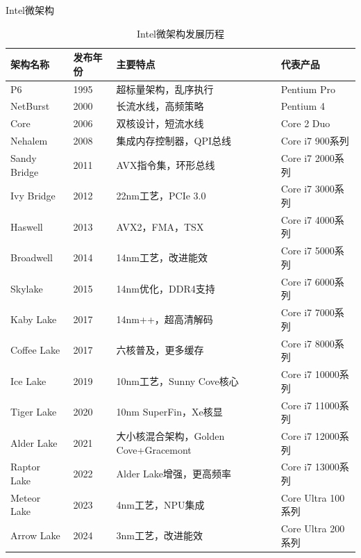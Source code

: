 \documentclass[12pt,UTF8]{ctexbook}
\begin{document}
\begin{subsection}{Intel微架构}

\begin{table}[H]
    \centering
    \begin{tabular}{|p{2cm}|p{3cm}|p{6cm}|p{3cm}|}
        \hline
        \textbf{架构名称} & \textbf{发布年份} & \textbf{主要特点} & \textbf{代表产品} \\
        \hline
        P6 & 1995 & 超标量架构，乱序执行 & Pentium Pro \\
        \hline
        NetBurst & 2000 & 长流水线，高频策略 & Pentium 4 \\
        \hline
        Core & 2006 & 双核设计，短流水线 & Core 2 Duo \\
        \hline
        Nehalem & 2008 & 集成内存控制器，QPI总线 & Core i7 900系列 \\
        \hline
        Sandy Bridge & 2011 & AVX指令集，环形总线 & Core i7 2000系列 \\
        \hline
        Ivy Bridge & 2012 & 22nm工艺，PCIe 3.0 & Core i7 3000系列 \\
        \hline
        Haswell & 2013 & AVX2，FMA，TSX & Core i7 4000系列 \\
        \hline
        Broadwell & 2014 & 14nm工艺，改进能效 & Core i7 5000系列 \\
        \hline
        Skylake & 2015 & 14nm优化，DDR4支持 & Core i7 6000系列 \\
        \hline
        Kaby Lake & 2017 & 14nm++，超高清解码 & Core i7 7000系列 \\
        \hline
        Coffee Lake & 2017 & 六核普及，更多缓存 & Core i7 8000系列 \\
        \hline
        Ice Lake & 2019 & 10nm工艺，Sunny Cove核心 & Core i7 10000系列 \\
        \hline
        Tiger Lake & 2020 & 10nm SuperFin，Xe核显 & Core i7 11000系列 \\
        \hline
        Alder Lake & 2021 & 大小核混合架构，Golden Cove+Gracemont & Core i7 12000系列 \\
        \hline
        Raptor Lake & 2022 & Alder Lake增强，更高频率 & Core i7 13000系列 \\
        \hline
        Meteor Lake & 2023 & 4nm工艺，NPU集成 & Core Ultra 100系列 \\
        \hline
        Arrow Lake & 2024 & 3nm工艺，改进能效 & Core Ultra 200系列 \\
        \hline
    \end{tabular}
    \caption{Intel微架构发展历程}
    \label{tab:intel_microarchitecture}
\end{table}

\end{subsection}
\end{document}
